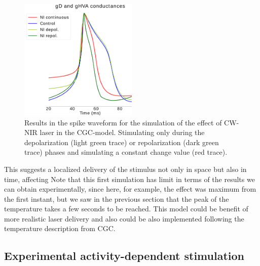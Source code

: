 \begin{figure}[htb!]
	\centering
	\includegraphics[width=0.5\textwidth]{img/laser/activity-dependent-model/depol_combined.png}
	\caption{Results in the spike waveform for the simulation of the effect of CW-NIR laser in the CGC-model. Stimulating only during the depolarization (light green trace) or repolarization (dark green trace) phases and simulating a constant change value (red trace).}
	\label{fig:activity dependent simulation results}
\end{figure}

This suggests a localized delivery of the stimulus not only in space but also in time, affecting  Note that this first simulation has limit in terms of the results we can obtain experimentally, since here, for example, the effect was maximum from the first instant, but we saw in the previous section that the peak of the temperature takes a few seconds to be reached. This model could be benefit of more realistic laser delivery and also could be also implemented following the temperature description from CGC. 

\subsection{Experimental activity-dependent stimulation}

